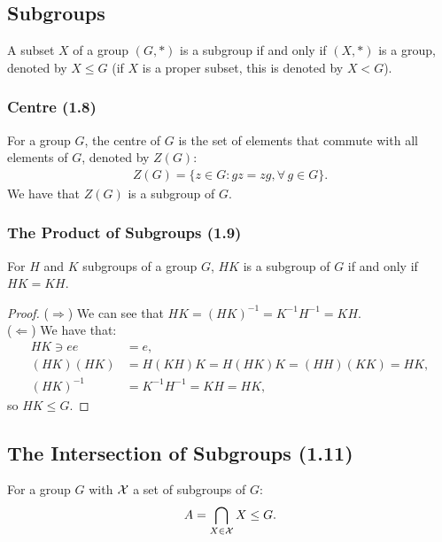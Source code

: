 \subsection{Subgroups}

A subset $X$ of a group $(G, \ast)$ is a subgroup if and only if $(X, \ast)$
is a group, denoted by $X \leq G$ (if $X$ is a proper subset, this
is denoted by $X < G$).

\subsubsection{Centre (1.8)} \label{1.8}

For a group $G$, the centre of $G$ is the set of elements that commute with all
elements of $G$, denoted by $Z(G)$: \begin{align*}
    Z(G) = \{z \in G : gz = zg, \forall \, g \in G\}.
\end{align*} We have that $Z(G)$ is a subgroup of $G$.

\newpage

\subsubsection{The Product of Subgroups (1.9)} \label{1.9}

For $H$ and $K$ subgroups of a group $G$, 
$HK$ is a subgroup of $G$ if and only if $HK = KH$.

\begin{proof}
    ($\Longrightarrow$) We can see that $HK = (HK)^{-1} = K^{-1}H^{-1} = KH$. 
    \\[\baselineskip]
    ($\Longleftarrow$) We have that: \begin{align*}
        HK \ni ee &= e, \\
        (HK)(HK) &= H(KH)K = H(HK)K = (HH)(KK) = HK, \\
        (HK)^{-1} &= K^{-1}H^{-1} = KH = HK,
    \end{align*} so $HK \leq G$.
\end{proof}

\subsection{The Intersection of Subgroups (1.11)} \label{1.11}

For a group $G$ with $\mathcal{X}$ a set of subgroups of $G$: \begin{align*}
    A = \bigcap_{X \in \mathcal{X}} X \leq G.
\end{align*}


